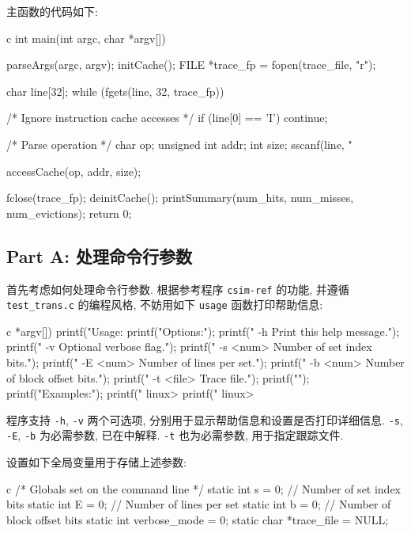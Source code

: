 主函数的代码如下:
\begin{code}{c}
int main(int argc, char *argv[]) {
  parseArgs(argc, argv);
  initCache();
  FILE *trace_fp = fopen(trace_file, "r");

  char line[32];
  while (fgets(line, 32, trace_fp)) {
    /* Ignore instruction cache accesses */
    if (line[0] == 'I')
      continue;

    /* Parse operation */
    char op;
    unsigned int addr;
    int size;
    sscanf(line, " %

    accessCache(op, addr, size);
  }

  fclose(trace_fp);
  deinitCache();
  printSummary(num_hits, num_misses, num_evictions);
  return 0;
}
\end{code}

\subsection{Part A: 处理命令行参数}

首先考虑如何处理命令行参数. 根据参考程序 \verb|csim-ref| 的功能, 并遵循 \verb|test_trans.c| 的编程风格, 不妨用如下 \verb|usage| 函数打印帮助信息:

\begin{code}{c}
 *argv[]) {
  printf("Usage: %
  printf("Options:\n");
  printf("  -h         Print this help message.\n");
  printf("  -v         Optional verbose flag.");
  printf("  -s <num>   Number of set index bits.\n");
  printf("  -E <num>   Number of lines per set.\n");
  printf("  -b <num>   Number of block offset bits.\n");
  printf("  -t <file>  Trace file.\n");
  printf("\n");
  printf("Examples:\n");
  printf("  linux>  %
  printf("  linux>  %
}
\end{code}

程序支持 \verb|-h|, \verb|-v| 两个可选项, 分别用于显示帮助信息和设置是否打印详细信息. \verb|-s|, \verb|-E|, \verb|-b| 为必需参数, 已在中解释. \verb|-t| 也为必需参数, 用于指定跟踪文件.

设置如下全局变量用于存储上述参数:
\begin{code}{c}
/* Globals set on the command line */
static int s = 0; // Number of set index bits
static int E = 0; // Number of lines per set
static int b = 0; // Number of block offset bits
static int verbose_mode = 0;
static char *trace_file = NULL;
\end{code}

